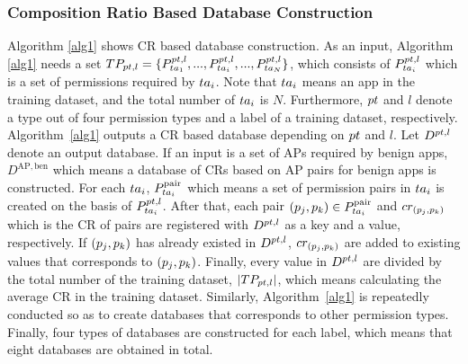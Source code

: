 \documentclass{ieeeaccess}
\begin{document}
\subsubsection{Composition Ratio Based Database Construction}
Algorithm \ref{alg1} shows CR based database construction.
As an input, Algorithm \ref{alg1} needs a set $TP_{pt, l} = \{P^{pt, l}_{ta_{1}}, ..., P^{pt, l}_{ta_{i}}, ..., P^{pt, l}_{ta_{N}}\}$, which consists of $P^{pt, l}_{ta_{i}}$ which is a set of permissions required by $ta_{i}$.  
Note that $ta_{i}$ means an app in the training dataset, and the total number of $ta_{i}$ is $N$.
Furthermore, $pt$ and $l$ denote a type out of four permission types and a label of a training dataset, respectively.
Algorithm~\ref{alg1} outputs a CR based database depending on $pt$ and $l$.
Let $D^{pt, l}$ denote an output database.
If an input is a set of APs required by benign apps, $D^{\mathrm{AP, ben}}$ which means a database of CRs based on AP pairs for benign apps is constructed.
For each $ta_{i}$, $P^{\mathrm{pair}}_{ta_{i}}$ which means a set of permission pairs in $ta_{i}$ is created on the basis of $P^{pt, l}_{ta_{i}}$.
After that, each pair $(p_j, p_k) \in P^{\mathrm{pair}}_{ta_{i}}$ and $cr_{(p_j, p_k)}$ which is the CR of pairs are registered with $D^{pt, l}$ as a key and a value, respectively.
If $(p_j, p_k)$ has already existed in $D^{pt, l}$, $cr_{(p_j, p_k)}$ are added to existing values that corresponds to $(p_j, p_k)$.
Finally, every value in $D^{pt, l}$ are divided by the total number of the training dataset, $|TP_{pt, l}|$, which means calculating the average CR in the training dataset.
Similarly, Algorithm~\ref{alg1} is repeatedly conducted so as to create databases that corresponds to other permission types. 
Finally, four types of databases are constructed for each label, which means that eight databases are obtained in total.  
\end{document}
